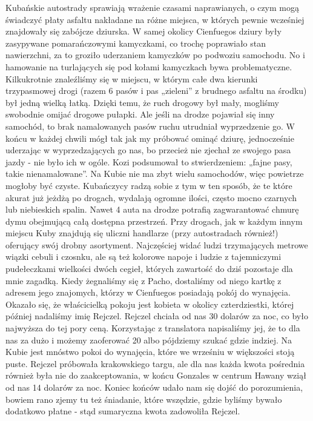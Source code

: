 \noindent Kubańskie autostrady sprawiają wrażenie czasami naprawianych, o czym mogą świadczyć płaty asfaltu nakładane na różne miejsca, w których pewnie wcześniej znajdowały się zabójcze dziurska.
W samej okolicy Cienfuegos dziury były zasypywane pomarańczowymi kamyczkami, co trochę poprawiało stan nawierzchni, za to groziło uderzaniem kamyczków po podwoziu samochodu.
No i hamowanie na turlających się pod kołami kamyczkach bywa problematyczne.
Kilkukrotnie znaleźliśmy się w miejscu, w którym całe dwa kierunki trzypasmowej drogi (razem 6 pasów i pas „zieleni” z brudnego asfaltu na środku) był jedną wielką łatką.
Dzięki temu, że ruch drogowy był mały, mogliśmy swobodnie omijać drogowe pułapki.
Ale jeśli na drodze pojawiał się inny samochód, to brak namalowanych pasów ruchu utrudniał wyprzedzenie go.
W końcu w każdej chwili mógł tak jak my próbować ominąć dziurę, jednocześnie uderzając w wyprzedzających go nas, bo przecież nie zjechał ze swojego pasa jazdy - nie było ich w ogóle.
Kozi podsumował to stwierdzeniem: „fajne pasy, takie nienamalowane”. 
Na Kubie nie ma zbyt wielu samochodów, więc powietrze mogłoby być czyste.
Kubańczycy radzą sobie z tym w ten sposób, że te które akurat już jeżdżą po drogach, wydalają ogromne ilości, często mocno czarnych lub niebieskich spalin.
Nawet 4 auta na drodze potrafią zagwarantować chmurę dymu obejmującą całą dostępna przestrzeń.
Przy drogach, jak w każdym innym miejscu Kuby znajdują się uliczni handlarze (przy autostradach również!) oferujący swój drobny asortyment.
Najczęściej widać ludzi trzymających metrowe wiązki cebuli i czosnku, ale są też kolorowe napoje i ludzie z tajemniczymi pudełeczkami wielkości dwóch cegieł, których zawartość do dziś pozostaje dla mnie zagadką.
Kiedy żegnaliśmy się z Pacho, dostaliśmy od niego kartkę z adresem jego znajomych, którzy w Cienfuegos posiadają pokój do wynajęcia.
Okazało się, że właścicielką pokoju jest kobieta w okolicy czterdziestki, której później nadaliśmy imię Rejczel.
Rejczel chciała od nas 30 dolarów za noc, co było najwyższa do tej pory ceną.
Korzystając z translatora napisaliśmy jej, że to dla nas za dużo i możemy zaoferować 20 albo pójdziemy szukać gdzie indziej.
Na Kubie jest mnóstwo pokoi do wynajęcia, które we wrześniu w większości stoją puste.
Rejczel próbowała krakowskiego targu, ale dla nas każda kwota pośrednia również była nie do zaakceptowania, w końcu Gonzales w centrum Hawany wziął od nas 14 dolarów za noc.
Koniec końców udało nam się dojść do porozumienia, bowiem rano zjemy tu też śniadanie, które wszędzie, gdzie byliśmy bywało dodatkowo płatne - stąd sumaryczna kwota zadowoliła Rejczel.
